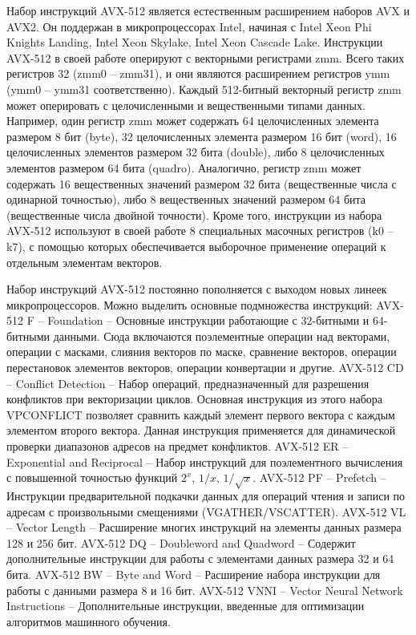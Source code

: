 \documentclass[
11pt,%
tightenlines,%
twoside,%
onecolumn,%
nofloats,%
nobibnotes,%
nofootinbib,%
superscriptaddress,%
noshowpacs,%
centertags]%
{revtex4}
\begin{document}
Набор инструкций AVX-512 является естественным расширением наборов AVX и AVX2.
Он поддержан в микропроцессорах Intel, начиная с Intel Xeon Phi Knights Landing, Intel Xeon Skylake, Intel Xeon Cascade Lake.
Инструкции AVX-512 в своей работе оперируют с векторными регистрами zmm.
Всего таких регистров 32 (zmm0 -- zmm31), и они являются расширением регистров ymm (ymm0 -- ymm31 соответственно).
Каждый 512-битный векторный регистр zmm может оперировать с целочисленными и вещественными типами данных.
Например, один регистр zmm может содержать 64 целочисленных элемента размером 8 бит (byte), 32 целочисленных элемента размером 16 бит (word), 16 целочисленных элементов размером 32 бита (double), либо 8 целочисленных элементов размером 64 бита (quadro).
Аналогично, регистр zmm может содержать 16 вещественных значений размером 32 бита (вещественные числа с одинарной точностью), либо 8 вещественных значений размером 64 бита (вещественные числа двойной точности).
Кроме того, инструкции из набора AVX-512 используют в своей работе 8 специальных масочных регистров (k0 -- k7), с помощью которых обеспечивается выборочное применение операций к отдельным элементам векторов.
    
Набор инструкций AVX-512 постоянно пополняется с выходом новых линеек микропроцессоров.
Можно выделить основные подмножества инструкций:
AVX-512 F -- Foundation -- Основные инструкции работающие с 32-битными и 64-битными данными.
Сюда включаются поэлементные операции над векторами, операции с масками, слияния векторов по маске, сравнение векторов, операции перестановок элементов векторов, операции конвертации и другие.
AVX-512 CD -- Conflict Detection -- Набор операций, предназначенный для разрешения конфликтов при векторизации циклов. Основная инструкция из этого набора VPCONFLICT позволяет сравнить каждый элемент первого вектора с каждым элементом второго вектора. Данная инструкция применяется для динамической проверки диапазонов адресов на предмет конфликтов.
AVX-512 ER -- Exponential and Reciprocal -- Набор инструкций для поэлементного вычисления с повышенной точностью функций $2^x$, $1/x$, $1/\sqrt{x}$.
AVX-512 PF -- Prefetch -- Инструкции предварительной подкачки данных для операций чтения и записи по адресам с произвольными смещениями (VGATHER/VSCATTER).
AVX-512 VL -- Vector Length -- Расширение многих инструкций на элементы данных размера 128 и 256 бит.
AVX-512 DQ -- Doubleword and Quadword -- Содержит дополнительные инструкции для работы с элементами данных размера 32 и 64 бита.
AVX-512 BW -- Byte and Word -- Расширение набора инструкции для работы с данными размера 8 и 16 бит. 
AVX-512 VNNI -- Vector Neural Network Instructions -- Дополнительные инструкции, введенные для оптимизации алгоритмов машинного обучения.
\end{document}
